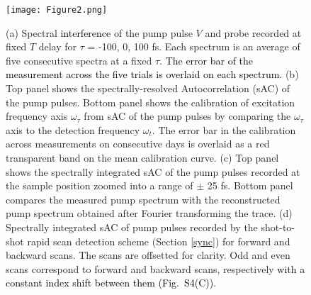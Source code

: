\documentclass[%
aip,
amsmath,amssymb,
preprint,%
]{revtex4-2}
\newcommand*{\vt}[1]{\textcolor{black}{ #1}}
\newcommand*{\si}[1]{\textcolor{black}{ #1}}
\newcommand*{\AST}[1]{\textcolor{black}{ #1}}
\begin{document}
\begin{figure}[h!]
	\centering\texttt{[image: Figure2.png]}
	\caption{(a) Spectral \AST{interference} of the pump pulse $V$ and probe recorded at fixed $T$ delay for $\tau$ = -100, 0, 100 fs. Each spectrum is an average of five consecutive spectra at a fixed $\tau$. \vt{The error bar of the measurement across the five trials is overlaid on each spectrum.} (b) Top panel shows the spectrally-resolved Autocorrelation (sAC) of the pump pulses. Bottom panel shows the calibration of excitation frequency axis $\omega_{\tau}$ from sAC of the pump pulses by comparing the $\omega_{\tau}$ axis to the detection frequency $\omega_t$. The error bar in the calibration across measurements on consecutive days is overlaid as a red transparent band on the mean calibration curve. (c) Top panel shows the spectrally integrated sAC of the pump pulses recorded at the sample position zoomed into a range of $\pm$ 25 fs. Bottom panel compares the measured pump spectrum with the reconstructed pump spectrum obtained after Fourier transforming the trace. (d) Spectrally integrated sAC of pump pulses recorded by the shot-to-shot rapid scan detection scheme (Section \ref{sync}) for forward and backward scans. The scans are offsetted for clarity. Odd and even scans correspond to forward and backward scans, respectively \si{with a constant index shift between them (Fig.~S4(C))}. }
	\label{fig:fig2}
\end{figure}
\end{document}
